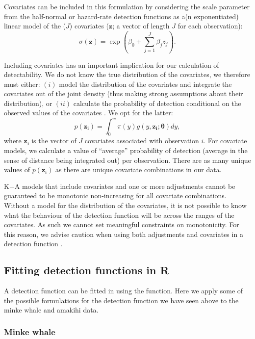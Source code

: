 \documentclass[article,shortnames]{jss}
\begin{document}
Covariates can be included in this formulation by considering the scale
parameter from the half-normal or hazard-rate detection functions as a(n
exponentiated) linear model of the (\(J\)) covariates (\(\mathbf{z}\); a
vector of length \(J\) for each observation): \[
\sigma(\mathbf{z}) = \exp(\beta_0 + \sum_{j=1}^J \beta_j z_j).
\]

Including covariates has an important implication for our calculation of
detectability. We do not know the true distribution of the covariates,
we therefore must either: \((i)\) model the distribution of the
covariates and integrate the covariates out of the joint density (thus
making strong assumptions about their distribution), or \((ii)\)
calculate the probability of detection conditional on the observed
values of the covariates \citep{Marques:2003vb}. We opt for the latter:
\[
p(\mathbf{z_i}) = \int_0^w \pi(y) g(y, \mathbf{z_i}; \boldsymbol{\theta}) dy,
\] where \(\mathbf{z_i}\) is the vector of \(J\) covariates associated
with observation \(i\). For covariate models, we calculate a value of
``average'' probability of detection (average in the sense of distance
being integrated out) per observation. There are as many unique values
of \(p(\mathbf{z_i})\) as there are unique covariate combinations in our
data.

K+A models that include covariates and one or more adjustments cannot be
guaranteed to be monotonic non-increasing for all covariate
combinations. Without a model for the distribution of the covariates, it
is not possible to know what the behaviour of the detection function
will be across the ranges of the covariates. As such we cannot set
meaningful constraints on monotonicity. For this reason, we advise
caution when using both adjustments and covariates in a detection
function \citep[see][ for an example of when this can be
problematic]{Miller:2015hw}.

\subsection{Fitting detection functions in
R}\label{fitting-detection-functions-in-r}

A detection function can be fitted in  using the 
function. Here we apply some of the possible formulations for the
detection function we have seen above to the minke whale and amakihi
data.

\subsubsection{Minke whale}\label{minke-whale}
\end{document}
